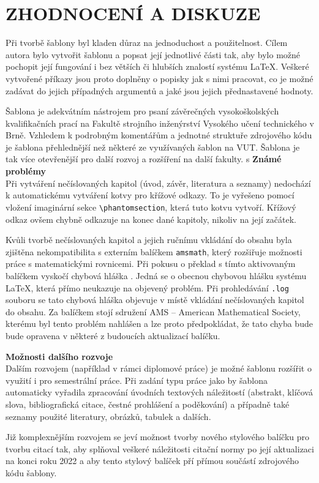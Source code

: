 
\chapter{ZHODNOCENÍ A DISKUZE}
Při tvorbě šablony byl kladen důraz na jednoduchost a použitelnost. Cílem autora bylo vytvořit šablonu a popsat její jednotlivé části tak, aby bylo možné pochopit její fungování i bez větších či hlubších znalostí systému \LaTeX. Veškeré vytvořené příkazy jsou proto doplněny o popisky jak s nimi pracovat, co je možné zadávat do jejich případných argumentů a jaké jsou jejich přednastavené hodnoty.

Šablona je adekvátním nástrojem pro psaní závěrečných vysokoškolských kvalifikačních prací na Fakultě strojního inženýrství Vysokého učení technického v Brně. Vzhledem k podrobným komentářům a jednotné struktuře zdrojového kódu je šablona přehlednější než některé ze využívaných šablon na VUT. Šablona je tak více otevřenější pro další rozvoj a rozšíření na další fakulty.
s
\vspace{8pt}
\textbf{Známé problémy}\\
Při vytváření nečíslovaných kapitol (úvod, závěr, literatura a seznamy) nedochází k automatickému vytváření kotvy pro křížové odkazy. To je vyřešeno pomocí vložení imaginární sekce \verb|\phantomsection|, která tuto kotvu vytvoří. Křížový odkaz ovšem chybně odkazuje na konec dané kapitoly, nikoliv na její začátek.

Kvůli tvorbě nečíslovaných kapitol a jejich ručnímu vkládání do obsahu byla zjištěna nekompatibilita s externím balíčkem \verb|amsmath|, který rozšiřuje možnosti práce s matematickými rovnicemi. Při pokusu o překlad s tímto aktivovaným balíčkem vyskočí chybová hláška . Jedná se o obecnou chybovou hlášku systému \LaTeX, která přímo neukazuje na objevený problém. Při prohledávání \verb|.log| souboru se tato chybová hláška objevuje v místě vkládání nečíslovaných kapitol do obsahu. Za balíčkem stojí sdružení AMS -- American Mathematical Society, kterému byl tento problém nahlášen a lze proto předpokládat, že tato chyba bude bude opravena v některé z budoucích aktualizací balíčku.

\vspace{8pt}
\textbf{Možnosti dalšího rozvoje}\\
Dalším rozvojem (například v rámci diplomové práce) je možné šablonu rozšířit o využití i pro semestrální práce. Při zadání typu práce jako  by šablona automaticky vyřadila zpracování úvodních textových náležitostí (abstrakt, klíčová slova, bibliografická citace, čestné prohlášení a poděkování) a případně také seznamy použité literatury, obrázků, tabulek a dalších.

Již komplexnějším rozvojem se jeví možnost tvorby nového stylového balíčku pro tvorbu citací tak, aby splňoval veškeré náležitosti citační normy po její aktualizaci na konci roku 2022 a aby tento stylový balíček pří přímou součástí zdrojového kódu šablony.

